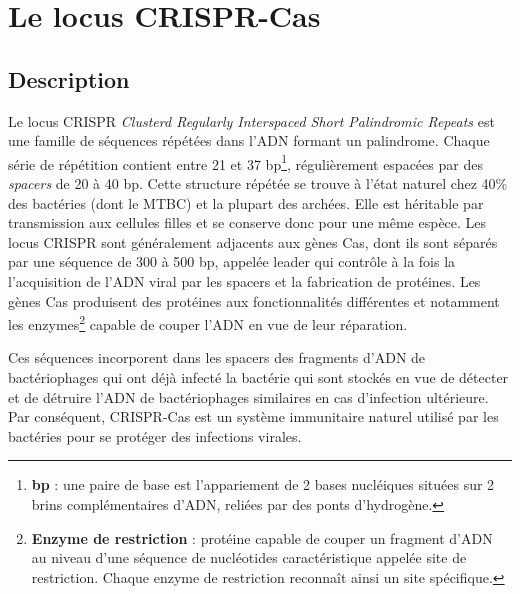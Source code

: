 \documentclass[twoside,a4paper,11pt,frenchb,openany]{report}
\begin{document}

\section{Le locus CRISPR-Cas}


\subsection{Description}

Le locus CRISPR \textit{Clusterd Regularly Interspaced Short Palindromic Repeats} est une famille de séquences répétées dans l'ADN formant un palindrome. Chaque série de répétition contient entre 21 et 37 bp\footnote{\textbf{bp} : une paire de base est l'appariement de 2 bases nucléiques situées sur 2 brins complémentaires d'ADN, reliées par des ponts d'hydrogène.}, régulièrement espacées par des \textit{spacers} de 20 à 40 bp. Cette structure répétée se trouve à l'état naturel chez 40\% des bactéries (dont le MTBC) et la plupart des archées. Elle est héritable par transmission aux cellules filles et se conserve donc pour une même espèce. Les locus CRISPR sont généralement adjacents aux gènes Cas, dont ils sont séparés par une séquence de 300 à 500 bp, appelée leader qui contrôle à la fois la l'acquisition de l'ADN viral par les spacers et la fabrication de protéines. Les gènes Cas produisent des protéines aux fonctionnalités différentes et notamment les enzymes\footnote{\textbf{Enzyme de restriction} : protéine capable de couper un fragment d'ADN au niveau d'une séquence de nucléotides caractéristique appelée site de restriction. Chaque enzyme de restriction reconnaît ainsi un site spécifique.} capable de couper l'ADN en vue de leur réparation.

Ces séquences incorporent dans les spacers des fragments d'ADN de bactériophages qui ont déjà infecté la bactérie qui sont stockés en vue de détecter et de détruire l'ADN de bactériophages similaires en cas d'infection ultérieure. Par conséquent, CRISPR-Cas est un système immunitaire naturel utilisé par les bactéries pour se protéger des infections virales. 
\end{document}
